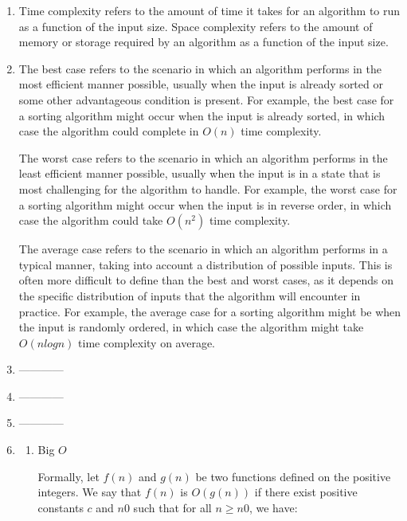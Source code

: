 \documentclass{article}
\begin{document}
\begin{enumerate}
    \item  Time complexity refers to the amount of time it takes for an algorithm to run as a function of the input size.
    Space complexity refers to the amount of memory or storage required by an algorithm as a function of the input size. 
    
    \item  The best case refers to the scenario in which an algorithm performs in the most efficient manner possible, usually when the input is already sorted or some other advantageous condition is present. For example, the best case for a sorting algorithm might occur when the input is already sorted, in which case the algorithm could complete in $O(n)$ time complexity.
    
    The worst case refers to the scenario in which an algorithm performs in the least efficient manner possible, usually when the input is in a state that is most challenging for the algorithm to handle. For example, the worst case for a sorting algorithm might occur when the input is in reverse order, in which case the algorithm could take $O(n^2)$ time complexity.
    
    The average case refers to the scenario in which an algorithm performs in a typical manner, taking into account a distribution of possible inputs. This is often more difficult to define than the best and worst cases, as it depends on the specific distribution of inputs that the algorithm will encounter in practice. For example, the average case for a sorting algorithm might be when the input is randomly ordered, in which case the algorithm might take $O(n log n)$ time complexity on average.

    

\item ------------

\item ------------

\item ------------

\item 

\begin{enumerate}
    \item Big  $O$ 
    
    Formally, let $f(n)$ and $g(n)$ be two functions defined on the positive integers. We say that $f(n)$ is $O(g(n))$ if there exist positive constants $c$ and $n0$ such that for all $n \geq n0$, we have:


\end{enumerate}
\end{enumerate}
\end{document}
